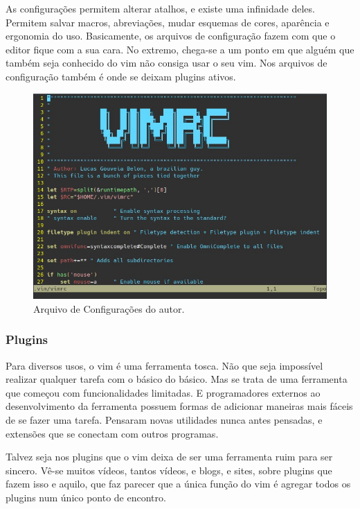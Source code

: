 As configurações permitem alterar atalhos, e existe uma infinidade deles.
Permitem salvar macros, abreviações, mudar esquemas de cores, aparência e ergonomia do uso.
Basicamente, os arquivos de configuração fazem com que o editor fique com a sua cara.
No extremo, chega-se a um ponto em que alguém que também seja conhecido do vim não consiga usar o seu vim.
Nos arquivos de configuração também é onde se deixam plugins ativos.

\begin{figure}[!ht]
\centering
\includegraphics[scale=0.7]{motivacao/Arquivo_De_Configuracao.jpg}
\caption{Arquivo de Configurações do autor.}
\end{figure}

\subsubsection{Plugins}
Para diversos usos, o vim é uma ferramenta tosca.
Não que seja impossível realizar qualquer tarefa com o básico do básico.
Mas se trata de uma ferramenta que começou com funcionalidades limitadas.
E programadores externos ao desenvolvimento da ferramenta possuem formas de
adicionar maneiras mais fáceis de se fazer uma tarefa.
Pensaram novas utilidades nunca antes pensadas, e extensões que se conectam com outros programas.

Talvez seja nos plugins que o vim deixa de ser uma ferramenta ruim para ser sincero.
Vê-se muitos vídeos, tantos vídeos, e blogs, e sites, sobre plugins que fazem isso e aquilo,
que faz parecer que a única função do vim é agregar todos os plugins num único ponto de encontro.

